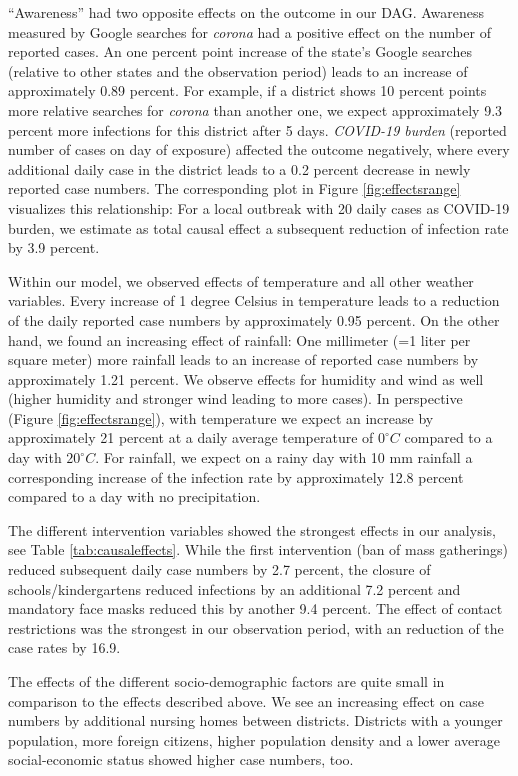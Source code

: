 \documentclass[]{elsarticle} %
\begin{document}
``Awareness'' had two opposite effects on the outcome in our DAG. Awareness measured by Google searches for \emph{corona} had a positive effect on the number of reported cases. An one percent point increase of the state's Google searches (relative to other states and the observation period) leads to an increase of approximately 0.89 percent. For example, if a district shows 10 percent points more relative searches for \emph{corona} than another one, we expect approximately 9.3 percent more infections for this district after 5 days. \emph{COVID-19 burden} (reported number of cases on day of exposure) affected the outcome negatively, where every additional daily case in the district leads to a 0.2 percent decrease in newly reported case numbers. The corresponding plot in Figure \ref{fig:effectsrange} visualizes this relationship: For a local outbreak with 20 daily cases as COVID-19 burden, we estimate as total causal effect a subsequent reduction of infection rate by 3.9 percent.

Within our model, we observed effects of temperature and all other weather variables. Every increase of 1 degree Celsius in temperature leads to a reduction of the daily reported case numbers by approximately 0.95 percent. On the other hand, we found an increasing effect of rainfall: One millimeter (=1 liter per square meter) more rainfall leads to an increase of reported case numbers by approximately 1.21 percent. We observe effects for humidity and wind as well (higher humidity and stronger wind leading to more cases). In perspective (Figure \ref{fig:effectsrange}), with temperature we expect an increase by approximately 21 percent at a daily average temperature of \(0^{\circ}C\) compared to a day with \(20^{\circ}C\). For rainfall, we expect on a rainy day with 10 mm rainfall a corresponding increase of the infection rate by approximately 12.8 percent compared to a day with no precipitation.

The different intervention variables showed the strongest effects in our analysis, see Table \ref{tab:causaleffects}. While the first intervention (ban of mass gatherings) reduced subsequent daily case numbers by 2.7 percent, the closure of schools/kindergartens reduced infections by an additional 7.2 percent and mandatory face masks reduced this by another 9.4 percent. The effect of contact restrictions was the strongest in our observation period, with an reduction of the case rates by 16.9.

The effects of the different socio-demographic factors are quite small in comparison to the effects described above. We see an increasing effect on case numbers by additional nursing homes between districts. Districts with a younger population, more foreign citizens, higher population density and a lower average social-economic status showed higher case numbers, too.
\end{document}
